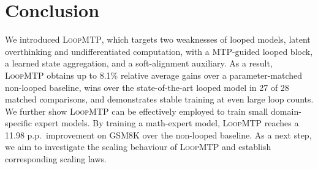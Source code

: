 \section{Conclusion}

We introduced \textsc{LoopMTP}, which targets two weaknesses of looped models, latent overthinking and undifferentiated computation, with a MTP-guided looped block, a learned state aggregation, and a soft-alignment auxiliary. As a result, \textsc{LoopMTP} obtains up to 8.1\% relative average gains over a parameter-matched non-looped baseline, wins over the state-of-the-art looped model in 27 of 28 matched comparisons, and demonstrates stable training at even large loop counts. We further show \textsc{LoopMTP} can be effectively employed to train small domain-specific expert models. By training a math-expert model, \textsc{LoopMTP} reaches a 11.98 p.p.~improvement on GSM8K over the non-looped baseline. As a next step, we aim to investigate the scaling behaviour of \textsc{LoopMTP} and establish corresponding scaling laws.


